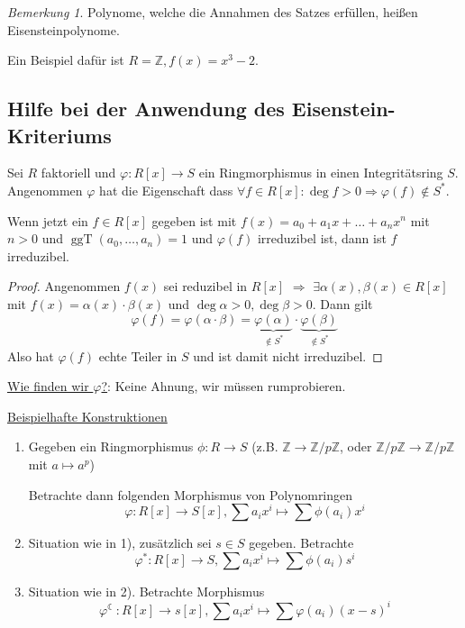 \documentclass[a4paper,12pt,numbers=noenddot,parskip=full]{scrartcl}
\newcommand{\setZ}{\mathbb{Z}}
\newcommand{\heading}{\underline}
\theoremstyle{dotless}
\theoremstyle{remark}
\newtheorem*{remark}{Bemerkung}
\begin{document}
	\begin{remark}
		Polynome, welche die Annahmen des Satzes erfüllen, heißen Eisensteinpolynome.
		
		Ein Beispiel dafür ist $R = \setZ, f(x) = x^3 - 2$.
	\end{remark}

	\subsection{Hilfe bei der Anwendung des Eisenstein-Kriteriums}
	
	Sei $R$ faktoriell und $\varphi: R[x] \to S$ ein Ringmorphismus in einen Integritätsring $S$. Angenommen $\varphi$ hat die Eigenschaft dass $\forall f \in R[x]: \deg f > 0 \Rightarrow \varphi(f) \notin S^*$.
	
	Wenn jetzt ein $f \in R[x]$ gegeben ist mit $f(x) = a_0 + a_1 x + \dots + a_n x^n$ mit $n > 0$ und $\operatorname{ggT}(a_0, \dots, a_n) = 1$ und $\varphi(f)$ irreduzibel ist, dann ist $f$ irreduzibel.
	
	\begin{proof}
		Angenommen $f(x)$ sei reduzibel in $R[x]$ $\Rightarrow$ $\exists \alpha(x), \beta(x) \in R[x]$ mit $f(x) = \alpha(x) \cdot \beta(x)$ und $\deg \alpha > 0, \deg \beta > 0$. Dann gilt
		\begin{equation*}
			\varphi(f) = \varphi(\alpha \cdot \beta)  = \underbrace{\varphi(\alpha)}_{\notin S^*} \cdot \underbrace{\varphi(\beta)}_{\notin S^*}
		\end{equation*}
		Also hat $\varphi(f)$ echte Teiler in $S$ und ist damit nicht irreduzibel.
	\end{proof}

	\heading{Wie finden wir $\varphi$?}: Keine Ahnung, wir müssen rumprobieren.
	
	\heading{Beispielhafte Konstruktionen}
	
	\begin{enumerate}
		\item Gegeben ein Ringmorphismus $\phi: R \to S$ (z.B. $\setZ \to \setZ / p \setZ$, oder $\setZ / p \setZ \to \setZ / p \setZ$ mit $ a \mapsto a^p$)
		
		Betrachte dann folgenden Morphismus von Polynomringen
		\begin{equation*}
			\varphi: R[x] \to S[x], \sum a_i x^i \mapsto \sum \phi(a_i) x^i
		\end{equation*}
		
		\item Situation wie in 1), zusätzlich sei $s \in S$ gegeben. Betrachte
		\begin{equation*}
			\varphi^*: R[x] \to S, \sum a_i x^i \mapsto \sum \phi(a_i) s^i	
		\end{equation*}
		
		\item Situation wie in 2). Betrachte Morphismus
		\begin{equation*}
			\varphi^{\leftmoon}: R[x] \to s[x], \sum a_i x^i \mapsto \sum \varphi(a_i) (x - s)^i
		\end{equation*}
	\end{enumerate}
\end{document}
